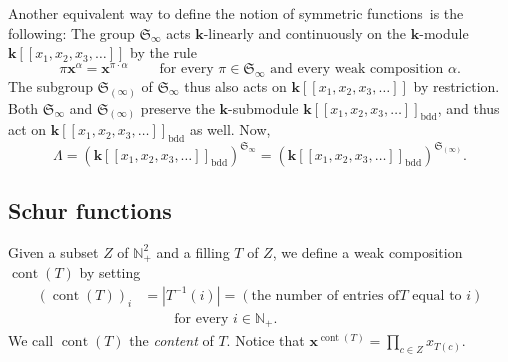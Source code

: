 \documentclass[numbers=enddot,12pt,final,onecolumn,notitlepage]{scrartcl}%
\theoremstyle{definition}
\let\prodnonlimits\prod
\renewcommand{\prod}{\prodnonlimits\limits}
\begin{document}
Another equivalent way to define the notion of symmetric functions\ is the
following: The group $\mathfrak{S}_{\infty}$ acts $\mathbf{k}$-linearly and
continuously on the $\mathbf{k}$-module $\mathbf{k}\left[  \left[  x_{1}%
,x_{2},x_{3},\ldots\right]  \right]  $ by the rule%
\[
\pi\mathbf{x}^{\alpha}=\mathbf{x}^{\pi\cdot\alpha}%
\ \ \ \ \ \ \ \ \ \ \text{for every }\pi\in\mathfrak{S}_{\infty}\text{ and
every weak composition }\alpha\text{.}%
\]
The subgroup $\mathfrak{S}_{\left(  \infty\right)  }$ of $\mathfrak{S}%
_{\infty}$ thus also acts on $\mathbf{k}\left[  \left[  x_{1},x_{2}%
,x_{3},\ldots\right]  \right]  $ by restriction. Both $\mathfrak{S}_{\infty}$
and $\mathfrak{S}_{\left(  \infty\right)  }$ preserve the $\mathbf{k}%
$-submodule $\mathbf{k}\left[  \left[  x_{1},x_{2},x_{3},\ldots\right]
\right]  _{\operatorname*{bdd}}$, and thus act on $\mathbf{k}\left[  \left[
x_{1},x_{2},x_{3},\ldots\right]  \right]  _{\operatorname*{bdd}}$ as well.
Now,%
\[
\Lambda=\left(  \mathbf{k}\left[  \left[  x_{1},x_{2},x_{3},\ldots\right]
\right]  _{\operatorname*{bdd}}\right)  ^{\mathfrak{S}_{\infty}}=\left(
\mathbf{k}\left[  \left[  x_{1},x_{2},x_{3},\ldots\right]  \right]
_{\operatorname*{bdd}}\right)  ^{\mathfrak{S}_{\left(  \infty\right)  }}.
\]


\subsection{Schur functions}

Given a subset $Z$ of $\mathbb{N}_{+}^{2}$ and a filling $T$ of $Z$, we define
a weak composition $\operatorname*{cont}\left(  T\right)  $ by setting%
\begin{align*}
\left(  \operatorname*{cont}\left(  T\right)  \right)  _{i}  &  =\left\vert
T^{-1}\left(  i\right)  \right\vert =\left(  \text{the number of entries of
}T\text{ equal to }i\right) \\
&  \ \ \ \ \ \ \ \ \ \ \text{for every }i\in\mathbb{N}_{+}.
\end{align*}
We call $\operatorname*{cont}\left(  T\right)  $ the \textit{content} of $T$.
Notice that $\mathbf{x}^{\operatorname*{cont}\left(  T\right)  }=\prod_{c\in
Z}x_{T\left(  c\right)  }$.
\end{document}
